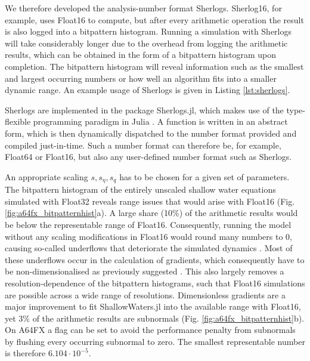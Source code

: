 We therefore developed the analysis-number format Sherlogs. Sherlog16, for example, uses Float16 to compute,
but after every arithmetic operation the result is also logged into a bitpattern histogram. Running a simulation with
Sherlogs will take considerably longer due to the overhead from logging the arithmetic results, which can be obtained
in the form of a bitpattern histogram upon completion. The bitpattern histogram will reveal information such as the
smallest and largest occurring numbers or how well an algorithm fits into a smaller dynamic range.
An example usage of Sherlogs is given in Listing \ref{lst:sherlogs}.

Sherlogs are implemented in the package Sherlogs.jl, which makes use of the type-flexible
programming paradigm in Julia \citep{Bezanson2017}. A function is written in an abstract form,
which is then dynamically dispatched to the number format provided and compiled just-in-time.
Such a number format can therefore be, for example, Float64 or Float16, but also any user-defined
number format such as Sherlogs.

An appropriate scaling $s,s_\eta,s_q$ has to be chosen for a given set of parameters. The bitpattern
histogram of the entirely unscaled shallow water equations simulated with Float32 reveals range issues
that would arise with Float16 (Fig. \ref{fig:a64fx_bitpatternhist}a). A large share (10\%) of the arithmetic
results would be below the representable range of Float16. Consequently, running the model without
any scaling modifications in Float16 would round many numbers to 0, causing so-called underflows
that deteriorate the simulated dynamics \citep{Klower2020a}. Most of these underflows occur in the
calculation of gradients, which consequently have to be non-dimensionalised as previously suggested
\citep{Klower2019a}. This also largely removes a resolution-dependence of the bitpattern histograms,
such that Float16 simulations are possible across a wide range of resolutions. Dimensionless gradients
are a major improvement to fit ShallowWaters.jl into the available range with Float16, yet 3\% of the
arithmetic results are subnormals (Fig. \ref{fig:a64fx_bitpatternhist}b). On A64FX a flag can be set to
avoid the performance penalty from subnormals by flushing every occurring subnormal to zero.
The smallest representable number is therefore $6.104 \cdot 10^{-5}$.

